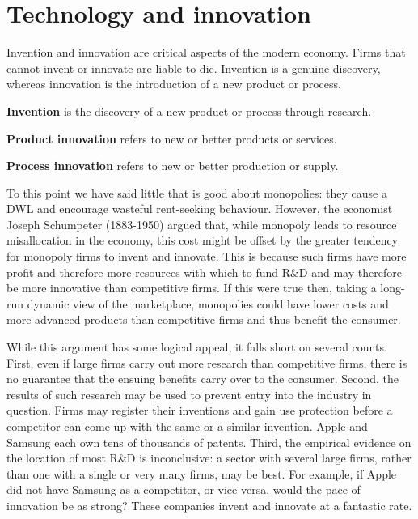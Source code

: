 \section{Technology and innovation}\label{sec:ch10sec8}

Invention and innovation are critical aspects of the modern economy. Firms that cannot invent or innovate are liable to die. Invention is a genuine discovery, whereas innovation is the introduction of a new product or process. 

\begin{DefBox}
\textbf{Invention} is the discovery of a new product or process through research.

\textbf{Product innovation} refers to new or better products or services.

\textbf{Process innovation} refers to new or better production or supply.
\end{DefBox}

To this point we have said little that is good about monopolies: they cause a DWL and encourage wasteful rent-seeking behaviour. However, the economist Joseph Schumpeter (1883-1950) argued that, while monopoly leads to resource misallocation in the economy, this cost might be offset by the greater tendency for monopoly firms to invent and innovate. This is because such firms have more profit and therefore more resources with which to fund R\&D and may therefore be more innovative than competitive firms. If this were true then, taking a long-run dynamic view of the marketplace, monopolies could have lower costs and more advanced products than competitive firms and thus benefit the consumer.

While this argument has some logical appeal, it falls short on several counts. First, even if large firms carry out more research than competitive firms, there is no guarantee that the ensuing benefits carry over to the consumer. Second, the results of such research may be used to prevent entry into the industry in question. Firms may register their inventions and gain use protection before a competitor can come up with the same or a similar invention. Apple and Samsung each own tens of thousands of patents. Third, the empirical evidence on the location of most R\&D is inconclusive: a sector with several large firms, rather than one with a single or very many firms, may be best.  For example, if Apple did not have Samsung as a competitor, or vice versa, would the pace of innovation be as strong? These companies invent and innovate at a fantastic rate.

